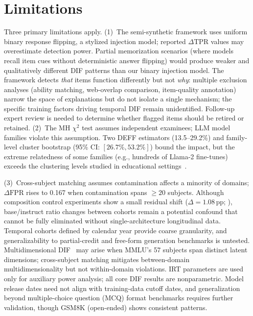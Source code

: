\raggedbottom
\enlargethispage{-6\baselineskip}
\section*{Limitations}

Three primary limitations apply. (1)~The semi-synthetic framework uses uniform binary response flipping, a stylized injection model; reported $\Delta\mathrm{TPR}$ values may overestimate detection power. Partial memorization scenarios (where models recall item cues without deterministic answer flipping) would produce weaker and qualitatively different DIF patterns than our binary injection model. The framework detects \emph{that} items function differently but not \emph{why}: multiple exclusion analyses (ability matching, web-overlap comparison, item-quality annotation) narrow the space of explanations but do not isolate a single mechanism; the specific training factors driving temporal DIF remain unidentified. Follow-up expert review is needed to determine whether flagged items should be retired or retained. (2)~The MH $\chi^2$ test assumes independent examinees; LLM model families violate this assumption. Two DEFF estimators (13.5--29.2\%) and family-level cluster bootstrap (95\% CI: $[26.7\%, 53.2\%]$) bound the impact, but the extreme relatedness of some families (e.g., hundreds of Llama-2 fine-tunes) exceeds the clustering levels studied in educational settings~\citep{french2010hierarchical}.

(3)~Cross-subject matching assumes contamination affects a minority of domains; $\Delta\mathrm{FPR}$ rises to 0.167 when contamination spans ${\geq}20$ subjects. Although composition control experiments show a small residual shift ($\Delta = 1.08$\,pp; ), base/instruct ratio changes between cohorts remain a potential confound that cannot be fully eliminated without single-architecture longitudinal data. Temporal cohorts defined by calendar year provide coarse granularity, and generalizability to partial-credit and free-form generation benchmarks is untested. Multidimensional DIF~\citep{ackerman1992didmf} may arise when MMLU's 57 subjects span distinct latent dimensions; cross-subject matching mitigates between-domain multidimensionality but not within-domain violations. IRT parameters are used only for auxiliary power analysis; all core DIF results are nonparametric. Model release dates need not align with training-data cutoff dates, and generalization beyond multiple-choice question (MCQ) format benchmarks requires further validation, though GSM8K (open-ended) shows consistent patterns.
